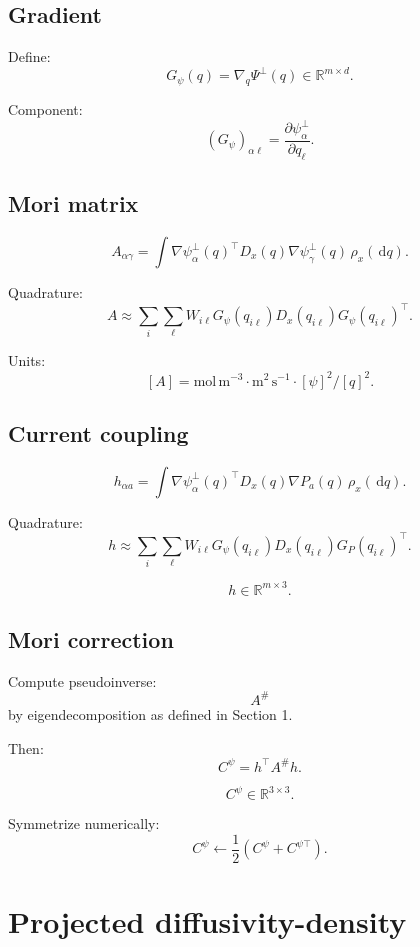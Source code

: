 \documentclass[11pt]{article}
\newcommand{\dd}{\,\mathrm d}
\newcommand{\R}{\mathbb R}
\begin{document}
  \subsection{Gradient}

  Define:
  \[
  G_\psi(q)
  =
  \nabla_q\Psi^\perp(q)
  \in\R^{m\times d}.
  \]

  Component:
  \[
  (G_\psi)_{\alpha\ell}
  =
  \frac{\partial\psi_\alpha^\perp}{\partial q_\ell}.
  \]

  \subsection{Mori matrix}

  \[
  A_{\alpha\gamma}
  =
  \int
  \nabla\psi_\alpha^\perp(q)^\top
  D_x(q)
  \nabla\psi_\gamma^\perp(q)
  \,\rho_x(\dd q).
  \]

  Quadrature:
  \[
  A
  \approx
  \sum_i\sum_{\ell}
  W_{i\ell}
  G_\psi(q_{i\ell})
  D_x(q_{i\ell})
  G_\psi(q_{i\ell})^\top.
  \]

  Units:
  \[
  [A]=\mathrm{mol\,m^{-3}}\cdot \mathrm{m^2\,s^{-1}}\cdot [\psi]^2/[q]^2.
  \]

  \subsection{Current coupling}

  \[
  h_{\alpha a}
  =
  \int
  \nabla\psi_\alpha^\perp(q)^\top
  D_x(q)
  \nabla P_a(q)
  \,\rho_x(\dd q).
  \]

  Quadrature:
  \[
  h
  \approx
  \sum_i\sum_\ell
  W_{i\ell}
  G_\psi(q_{i\ell})
  D_x(q_{i\ell})
  G_P(q_{i\ell})^\top.
  \]

  \[
  h\in\R^{m\times3}.
  \]

  \subsection{Mori correction}

  Compute pseudoinverse:
  \[
  A^\#
  \]
  by eigendecomposition as defined in Section 1.

  Then:
  \[
  C^\psi=h^\top A^\# h.
  \]

  \[
  C^\psi\in\R^{3\times3}.
  \]

  Symmetrize numerically:
  \[
  C^\psi\leftarrow\frac12(C^\psi+C^{\psi\top}).
  \]

  \section{Projected diffusivity-density}
\end{document}
